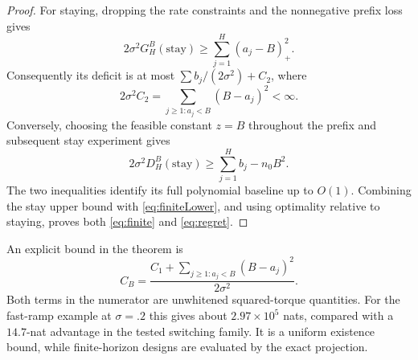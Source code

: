 \begin{proof}
For staying, dropping the rate constraints and the nonnegative prefix loss gives
\begin{equation}
 2\sigma^2G_H^B(\mathrm{stay})\ge\sum_{j=1}^H(a_j-B)_+^2.
\end{equation}
Consequently its deficit is at most $\sum b_j/(2\sigma^2)+C_2$, where
\begin{equation}
 2\sigma^2C_2=\sum_{j\ge1:a_j<B}(B-a_j)^2<\infty.
\end{equation}
Conversely, choosing the feasible constant $z=B$ throughout the prefix and subsequent stay experiment gives
\begin{equation}
2\sigma^2D_H^B(\mathrm{stay})\ge\sum_{j=1}^Hb_j-n_0B^2.
\end{equation}
The two inequalities identify its full polynomial baseline up to $O(1)$. Combining the stay upper bound with \eqref{eq:finiteLower}, and using optimality relative to staying, proves both \eqref{eq:finite} and \eqref{eq:regret}.
\end{proof}

An explicit bound in the theorem is
\begin{equation}
 C_B=\frac{C_1+\sum_{j\ge1:a_j<B}(B-a_j)^2}{2\sigma^2}.
 \label{eq:explicit_CB}
\end{equation}
Both terms in the numerator are unwhitened squared-torque quantities. For the fast-ramp example at $\sigma=.2$ this gives about $2.97\times10^5$ nats, compared with a $14.7$-nat advantage in the tested switching family. It is a uniform existence bound, while finite-horizon designs are evaluated by the exact projection.
